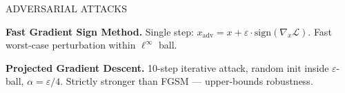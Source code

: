 \documentclass[final]{beamer}
\newlength{\coltwo}
\begin{document}
\begin{frame}[t]
\begin{columns}[t]
\begin{column}{\coltwo}
\begin{block}{ADVERSARIAL ATTACKS}
    \noindent
    \begin{minipage}[t]{0.13\linewidth}
      \vspace{3pt}
    \end{minipage}%
    \hspace{0.5em}%
    \begin{minipage}[t]{0.82\linewidth}
      \vspace{0pt}\small
      \textbf{Fast Gradient Sign Method.} Single step:
      $x_{\text{adv}} = x + \varepsilon \cdot \text{sign}(\nabla_x \mathcal{L})$.
      Fast worst-case perturbation within $\ell^\infty$ ball.
    \end{minipage}

    \vspace{1em}

    \noindent
    \begin{minipage}[t]{0.13\linewidth}
      \vspace{3pt}
    \end{minipage}%
    \hspace{0.5em}%
    \begin{minipage}[t]{0.82\linewidth}
      \vspace{0pt}\small
      \textbf{Projected Gradient Descent.} 10-step iterative attack,
      random init inside $\varepsilon$-ball, $\alpha = \varepsilon/4$.
      Strictly stronger than FGSM — upper-bounds robustness.
    \end{minipage}
  \end{block}


\end{column}
\end{columns}
\end{frame}
\end{document}
